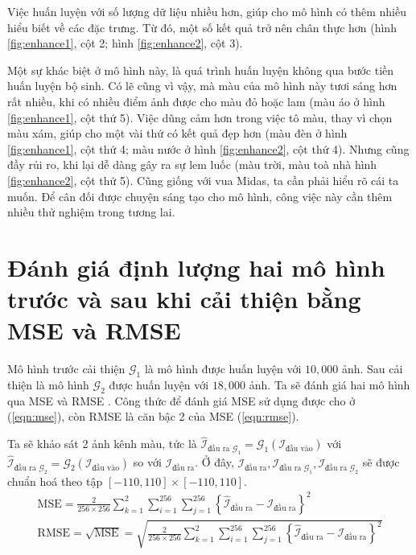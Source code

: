 \documentclass[a4paper, 12pt]{report}
\begin{document}
Việc huấn luyện với số lượng dữ liệu nhiều hơn, giúp cho mô hình có thêm nhiều hiểu biết về các đặc trưng.
Từ đó, một số kết quả trở nên chân thực hơn (hình \ref{fig:enhance1}, cột 2; hình \ref{fig:enhance2}, cột 3).\vspace{5pt}

Một sự khác biệt ở mô hình này, là quá trình huấn luyện không qua bước tiền huấn luyện bộ sinh.
Có lẽ cũng vì vậy, mà màu của mô hình này tươi sáng hơn rất nhiều, khi có nhiều điểm ảnh được cho màu đỏ hoặc lam (màu áo ở hình \ref{fig:enhance1}, cột thứ 5).
Việc dũng cảm hơn trong việc tô màu, thay vì chọn màu xám, giúp cho một vài thứ có kết quả đẹp hơn (màu đèn ở hình \ref{fig:enhance1}, cột thứ 4; màu nước ở hình \ref{fig:enhance2}, cột thứ 4).
Nhưng cũng đầy rủi ro, khi lại dễ dàng gây ra sự lem luốc (màu trời, màu toà nhà hình \ref{fig:enhance2}, cột thứ 5).
Cũng giống với vua Midas, ta cần phải hiểu rõ cái ta muốn.
Để cân đối được chuyện sáng tạo cho mô hình, công việc này cần thêm nhiều thử nghiệm trong tương lai.

\section{Đánh giá định lượng hai mô hình trước và sau khi cải thiện bằng MSE và RMSE}\label{mseandrmseeval}

Mô hình trước cải thiện $\mathcal{G}_1$ là mô hình được huấn luyện với $10,000$ ảnh.
Sau cải thiện là mô hình $\mathcal{G}_2$ được huấn luyện với $18,000$ ảnh.
Ta sẽ đánh giá hai mô hình qua MSE \cite{wikimse2021} và RMSE \cite{wikirmse2021}.
Công thức để đánh giá MSE sử dụng được cho ở (\ref{eqn:mse}), còn RMSE là căn bậc 2 của MSE (\ref{eqn:rmse}).\vspace{5pt}

Ta sẽ khảo sát 2 ảnh kênh màu, tức là $\widehat{\mathcal{I}}_{\text{đầu ra } \mathcal{G}_1} = \mathcal{G}_1\left(\mathcal{I}_{\text{đầu vào}}\right)$ với $\widehat{\mathcal{I}}_{\text{đầu ra } \mathcal{G}_2} = \mathcal{G}_2\left(\mathcal{I}_{\text{đầu vào}}\right)$ so với $\mathcal{I}_{\text{đầu ra}}$.
Ở đây, $\mathcal{I}_{\text{đầu ra}}, \mathcal{I}_{\text{đầu ra } \mathcal{G}_1}, \mathcal{I}_{\text{đầu ra } \mathcal{G}_2}$ sẽ được chuẩn hoá theo tập $[-110, 110] \times [-110, 110]$.
\begin{align}
    \text{MSE} = \frac{2}{256\times 256}\sum_{k=1}^{2}\sum_{i=1}^{256}\sum_{j=1}^{256}\left\{\widehat{\mathcal{I}}_{\text{đầu ra}} - \mathcal{I}_{\text{đầu ra}}\right\}^2 \label{eqn:mse}\\
    \text{RMSE} = \sqrt{\text{MSE}} = \sqrt{\frac{2}{256\times 256}\sum_{k=1}^{2}\sum_{i=1}^{256}\sum_{j=1}^{256}\left\{\widehat{\mathcal{I}}_{\text{đầu ra}} - \mathcal{I}_{\text{đầu ra}}\right\}^2} \label{eqn:rmse}
\end{align}
\end{document}

